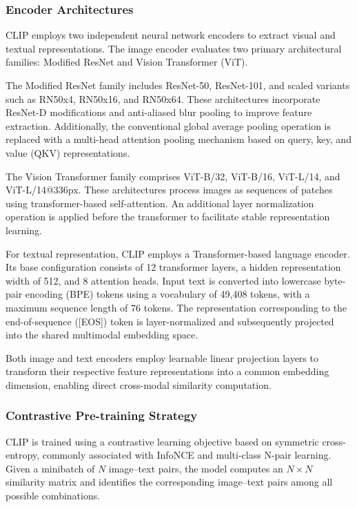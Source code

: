 \documentclass[pdflatex,sn-mathphys-num]{sn-jnl}%
\theoremstyle{thmstyleone}%
\theoremstyle{thmstyletwo}%
\theoremstyle{thmstylethree}%
\begin{document}
\subsubsection{Encoder Architectures}

CLIP employs two independent neural network encoders to extract visual and textual representations. The image encoder evaluates two primary architectural families: Modified ResNet and Vision Transformer (ViT).

The Modified ResNet family includes ResNet-50, ResNet-101, and scaled variants such as RN50x4, RN50x16, and RN50x64. These architectures incorporate ResNet-D modifications and anti-aliased blur pooling to improve feature extraction. Additionally, the conventional global average pooling operation is replaced with a multi-head attention pooling mechanism based on query, key, and value (QKV) representations.

The Vision Transformer family comprises ViT-B/32, ViT-B/16, ViT-L/14, and ViT-L/14@336px. These architectures process images as sequences of patches using transformer-based self-attention. An additional layer normalization operation is applied before the transformer to facilitate stable representation learning.

For textual representation, CLIP employs a Transformer-based language encoder. Its base configuration consists of 12 transformer layers, a hidden representation width of 512, and 8 attention heads. Input text is converted into lowercase byte-pair encoding (BPE) tokens using a vocabulary of 49,408 tokens, with a maximum sequence length of 76 tokens. The representation corresponding to the end-of-sequence ([EOS]) token is layer-normalized and subsequently projected into the shared multimodal embedding space.

Both image and text encoders employ learnable linear projection layers to transform their respective feature representations into a common embedding dimension, enabling direct cross-modal similarity computation.

\subsubsection{Contrastive Pre-training Strategy}

CLIP is trained using a contrastive learning objective based on symmetric cross-entropy, commonly associated with InfoNCE and multi-class N-pair learning. Given a minibatch of $N$ image--text pairs, the model computes an $N \times N$ similarity matrix and identifies the corresponding image--text pairs among all possible combinations.
\end{document}
